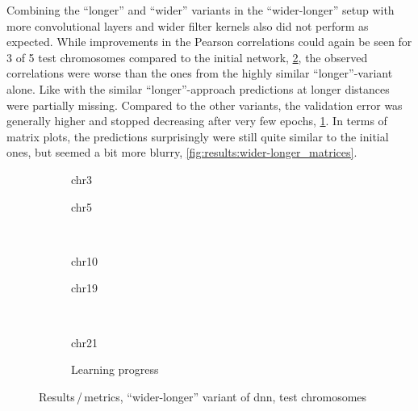 Combining the ``longer'' and ``wider'' variants in the ``wider-longer'' setup with more convolutional layers and wider 
filter kernels also did not perform as expected.
While improvements in the Pearson correlations could again be seen for 3 of 5 test chromosomes compared to the initial network, \cref{fig:results:wider-longerDNN_pearson},
the observed correlations were worse than the ones from the highly similar ``longer''-variant alone. 
Like with the similar ``longer''-approach predictions at longer distances were partially missing. 
Compared to the other variants, the validation error was generally higher and stopped decreasing after very few epochs, \cref{fig:results:wider-longerDNN_lossEpochs}.
In terms of matrix plots, the predictions surprisingly were still quite similar to the initial ones, but seemed a bit more blurry, \ref{fig:results:wider-longer_matrices}.
\begin{figure}[p]%
    \begin{subfigure}{0.45\textwidth}
        \scriptsize
        \caption{chr3}
    \end{subfigure} \hfill
    \begin{subfigure}{0.45\textwidth}
        \scriptsize
        \caption{chr5}
    \end{subfigure}\\[5mm]
    \begin{subfigure}{0.45\textwidth}
        \scriptsize
        \caption{chr10}
    \end{subfigure}\hfill
    \begin{subfigure}{0.45\textwidth}
        \scriptsize
        \caption{chr19}
    \end{subfigure}\\[3mm]
    \centering
    \begin{subfigure}{0.45\textwidth}
        \scriptsize
        \caption{chr21}
    \end{subfigure}\hfill
    \begin{subfigure}{0.45\textwidth}
        \caption{Learning progress} \label{fig:results:wider-longerDNN_lossEpochs}
    \end{subfigure}
    \caption{Results\,/\,metrics, ``wider-longer'' variant of \acrshort{dnn},  test chromosomes}
    \label{fig:results:wider-longerDNN_pearson}
\end{figure}
